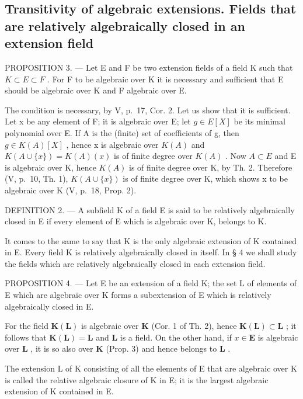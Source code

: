 \subsection{Transitivity of algebraic extensions. Fields that are relatively algebraically closed in an extension field}

PROPOSITION 3. --- Let E and F be two extension fields of a field K such that \(K \subset E \subset F\) . For F to be algebraic over K it is necessary and sufficient that E should be algebraic over K and F algebraic over E.

The condition is necessary, by V, p.~17, Cor. 2. Let us show that it is sufficient. Let x be any element of F; it is algebraic over E; let \(g \in E[X]\) be its minimal polynomial over E. If A is the (finite) set of coefficients of g, then \(g \in K(A)[X]\) , hence x is algebraic over \(K(A)\) and \(K(A \cup \{x\}) = K(A)(x)\) is of finite degree over \(K(A)\) . Now \(A \subset E\) and E is algebraic over K, hence \(K(A)\) is of finite degree over K, by Th. 2. Therefore (V, p.~10, Th. 1), \(K(A \cup \{x\})\) is of finite degree over K, which shows x to be algebraic over K (V, p.~18, Prop. 2).

DEFINITION 2. --- A subfield K of a field E is said to be relatively algebraically closed in E if every element of E which is algebraic over K, belongs to K.

It comes to the same to say that K is the only algebraic extension of K contained in E. Every field K is relatively algebraically closed in itself. In § 4 we shall study the fields which are relatively algebraically closed in each extension field.

PROPOSITION 4. --- Let E be an extension of a field K; the set L of elements of E which are algebraic over K forms a subextension of E which is relatively algebraically closed in E.

For the field \(\mathbf{K}(\mathbf{L})\) is algebraic over \(\mathbf{K}\) (Cor. 1 of Th. 2), hence \(\mathbf{K}(\mathbf{L}) \subset \mathbf{L}\) ; it follows that \(\mathbf{K}(\mathbf{L}) = \mathbf{L}\) and \(\mathbf{L}\) is a field. On the other hand, if \(x \in \mathbf{E}\) is algebraic over \(\mathbf{L}\) , it is so also over \(\mathbf{K}\) (Prop. 3) and hence belongs to \(\mathbf{L}\) .

The extension L of K consisting of all the elements of E that are algebraic over K is called the relative algebraic closure of K in E; it is the largest algebraic extension of K contained in E.

